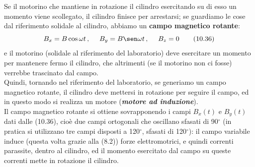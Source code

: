 Se il motorino che mantiene in rotazione il cilindro esercitando su di esso un
momento viene scollegato, il cilindro finisce per arrestarsi; se guardiamo le
cose dal riferimento solidale al cilindro, abbiamo un \textbf{campo magnetico
rotante}:
\begin{equation}
  B_x=B\cos\omega t\,,\quad\ B_y=B\sen\omega t\,,\quad\ B_z=0
  \tag{10.36}
\end{equation}
e il motorino (solidale al riferimento del laboratorio) deve esercitare un
momento per mantenere fermo il cilindro, che altrimenti (se il motorino non ci
fosse) verrebbe trascinato dal campo.\\
Quindi, tornando nel riferimento del laboratorio, se generiamo un campo
magnetico rotante, il cilindro deve mettersi in rotazione per seguire il campo,
ed in questo modo si realizza un motore (\textbf{\textit{motore ad
induzione}}).\\
Il campo magnetico rotante si ottiene sovrapponendo i campi $B_x(t)$ e $B_y(t)$
dati dalle (10.36), cio\`e due campi ortogonali che oscillano sfasati di
90$^\circ$ (in pratica si utilizzano tre campi disposti a 120$^\circ$, sfasati
di 120$^\circ$): il campo variabile induce \big(questa volta grazie alla
(8.2)\big) forze elettromotrici, e quindi correnti parassite, dentro al
cilindro, ed il momento esercitato dal campo su queste correnti mette in
rotazione il cilindro.
